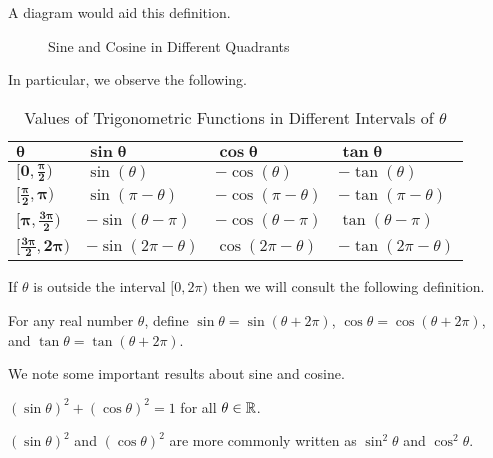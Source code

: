 A diagram would aid this definition.

\begin{figure}[H]
    \centering
    \caption{Sine and Cosine in Different Quadrants}
\end{figure}

In particular, we observe the following.
\begin{table}[H]
    \centering
    \begin{tabular}{|l|l|l|l|}
        \hline
        $\boldsymbol{\theta}$ & $\boldsymbol{\sin\theta}$ & $\boldsymbol{\cos\theta}$ & $\boldsymbol{\tan\theta}$ \\ \hline
        $\boldsymbol{[0,\frac\pi2)}$ & $\sin(\theta)$ & $-\cos(\theta)$ & $-\tan(\theta)$ \\ \hline
        $\boldsymbol{[\frac\pi2, \pi)}$ & $\sin(\pi-\theta)$ & $-\cos(\pi-\theta)$ & $-\tan(\pi-\theta)$ \\ \hline
        $\boldsymbol{[\pi,\frac{3\pi}2)}$ & $-\sin(\theta-\pi)$ & $-\cos(\theta-\pi)$ & $\tan(\theta-\pi)$ \\ \hline
        $\boldsymbol{[\frac{3\pi}2, 2\pi)}$ & $-\sin(2\pi-\theta)$ & $\cos(2\pi-\theta)$ & $-\tan(2\pi-\theta)$ \\ \hline
    \end{tabular}
    \caption{Values of Trigonometric Functions in Different Intervals of $\theta$}
\end{table}

If $\theta$ is outside the interval $[0, 2\pi)$ then we will consult the following definition.

\begin{definition}
    For any real number $\theta$, define $\sin\theta = \sin(\theta + 2\pi)$, $\cos\theta = \cos(\theta + 2\pi)$, and $\tan\theta = \tan(\theta + 2\pi)$.
\end{definition}

We note some important results about sine and cosine.
\begin{theorem}
    $(\sin\theta)^2 + (\cos\theta)^2 = 1$ for all $\theta \in \mathbb{R}$.
\end{theorem}
\begin{remark}
    $(\sin\theta)^2$ and $(\cos\theta)^2$ are more commonly written as $\sin^2\theta$ and $\cos^2\theta$.
\end{remark}

